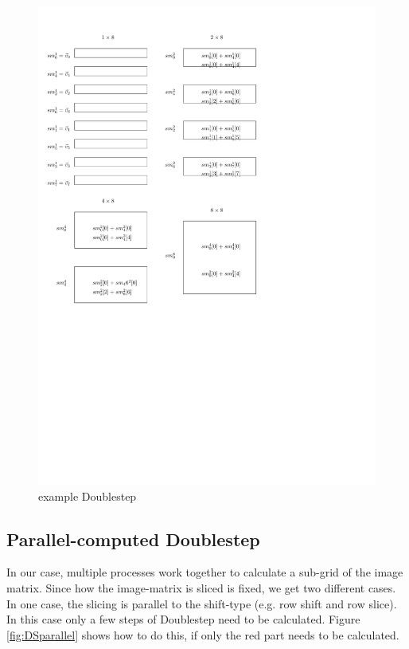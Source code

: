 \documentclass[12pt]{article}
\begin{document}
\begin{figure}[h!]
\includegraphics[scale=0.7]{Doublestep_overview}
\caption{example Doublestep}
\label{fig:DS}
\end{figure}

\subsection{ Parallel-computed Doublestep }

In our case, multiple processes work together to calculate a sub-grid of the image matrix. Since how the image-matrix is sliced is fixed, we get two different cases. In one case, the slicing is parallel to the shift-type (e.g. row shift and row slice). In this case only a few steps of Doublestep need to be calculated. Figure \ref{fig:DSparallel} shows how to do this, if only the red part needs to be calculated. \\
\end{document}
